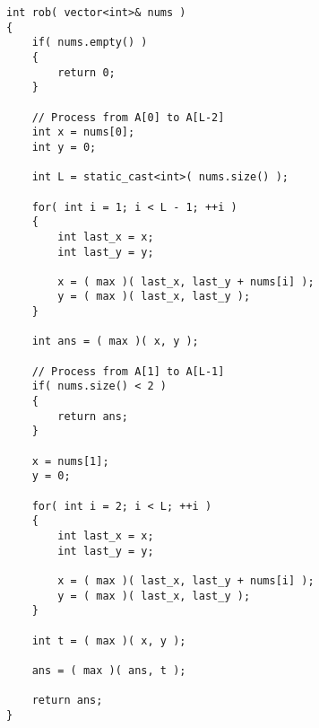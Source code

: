 \setcounter{lstlisting}{0}
\begin{lstlisting}[style=customc, caption={Dynamic Programming}]
int rob( vector<int>& nums )
{
    if( nums.empty() )
    {
        return 0;
    }

	// Process from A[0] to A[L-2]
    int x = nums[0];
    int y = 0;

    int L = static_cast<int>( nums.size() );

    for( int i = 1; i < L - 1; ++i )
    {
        int last_x = x;
        int last_y = y;

        x = ( max )( last_x, last_y + nums[i] );
        y = ( max )( last_x, last_y );
    }

    int ans = ( max )( x, y );

	// Process from A[1] to A[L-1]
    if( nums.size() < 2 )
    {
        return ans;
    }

    x = nums[1];
    y = 0;

    for( int i = 2; i < L; ++i )
    {
        int last_x = x;
        int last_y = y;

        x = ( max )( last_x, last_y + nums[i] );
        y = ( max )( last_x, last_y );
    }

    int t = ( max )( x, y );

    ans = ( max )( ans, t );

    return ans;
}
\end{lstlisting}
